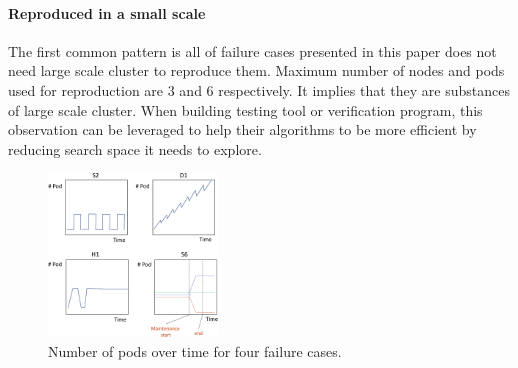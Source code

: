 \paragraph*{Reproduced in a small scale} The first common pattern is all of failure cases presented in this paper does not need large scale cluster to reproduce them. Maximum number of nodes and pods used for reproduction are 3 and 6 respectively. It implies that they are substances of large scale cluster. When building testing tool or verification program, this observation can be leveraged to help their algorithms to be more efficient by reducing search space it needs to explore.



\begin{figure}[h]
    \centering
    \includegraphics[width=0.4\textwidth]{figure/num_pod.pdf}
    \caption{Number of pods over time for four failure cases.}
    \label{fig:num_pod}
\end{figure}